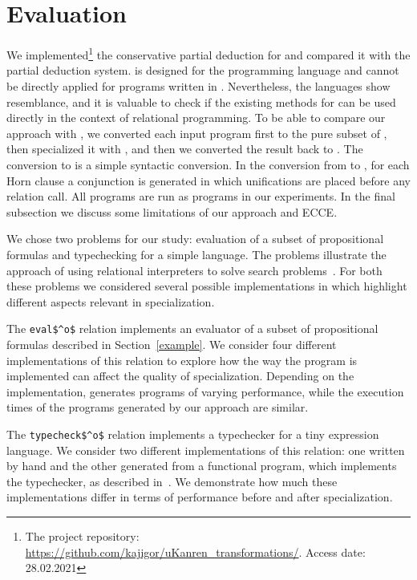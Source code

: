 \section{Evaluation}
\label{evaluation}

We implemented\footnote{The project repository: \url{https://github.com/kajigor/uKanren_transformations/}. Access date: 28.02.2021} the conservative partial deduction for \mk and compared it with the \ecce partial deduction system.
\ecce is designed for the \pro programming language and cannot be directly applied for programs written in \mk.
Nevertheless, the languages show resemblance, and it is valuable to check if the existing methods for \pro can be used directly in the context of relational programming.
To be able to compare our approach with \ecce, we converted each input program first to the pure subset of \pro, then specialized it with \ecce, and then we converted the result back to \mk.
The conversion to \pro is a simple syntactic conversion. In the conversion from \pro to \mk, for each Horn clause a conjunction is generated in which unifications are placed before any relation call.
All programs are run as \mk programs in our experiments.
In the final subsection we discuss some limitations of our approach and ECCE.

We chose two problems for our study: evaluation of a subset of propositional formulas and typechecking for a simple language.
The problems illustrate the approach of using relational interpreters to solve search problems~\cite{lozov2019relational}.
For both these problems we considered several possible implementations in \mk which highlight different aspects relevant in specialization.

The \lstinline{eval$^o$} relation implements an evaluator of a subset of propositional formulas described in Section~\ref{example}.
We consider four different implementations of this relation to explore how the way the program is implemented can affect the quality of specialization.
Depending on the implementation, \ecce generates programs of varying performance, while the execution times of the programs generated by our approach are similar.

The \lstinline{typecheck$^o$} relation implements a typechecker for a tiny expression language.
We consider two different implementations of this relation: one written by hand and the other generated from a functional program, which implements the typechecker, as described in~\cite{lozov2019relational}.
We demonstrate how much these implementations differ in terms of performance before and after specialization.

